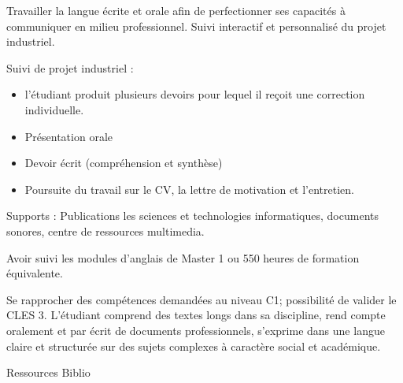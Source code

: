 {
Travailler la langue écrite et orale afin de perfectionner ses capacités à
communiquer en milieu professionnel. Suivi interactif et personnalisé du
projet industriel.

Suivi de projet industriel :
\begin{itemize}
\item l'étudiant produit plusieurs devoirs pour lequel il reçoit une correction individuelle.
\item Présentation orale
\item Devoir écrit (compréhension et synthèse)
\item Poursuite du travail sur le CV, la lettre de motivation et l'entretien.
\end{itemize}
Supports : Publications les sciences et technologies informatiques, documents
sonores, centre de ressources multimedia.
} 
{Avoir suivi les modules d'anglais de Master 1 ou 550 heures de formation
équivalente.} 
{\begin{itemize} 
  \ObjItem Se rapprocher des compétences demandées au niveau C1; possibilité de
valider le CLES 3.
  \ObjItem L'étudiant comprend des textes longs dans sa discipline, rend compte
oralement et par écrit de documents professionnels, s'exprime dans une
langue claire et structurée sur des sujets complexes à caractère social et
académique.
\end{itemize} 
} 
{Ressources} 
{Biblio} 
 
\vfill

